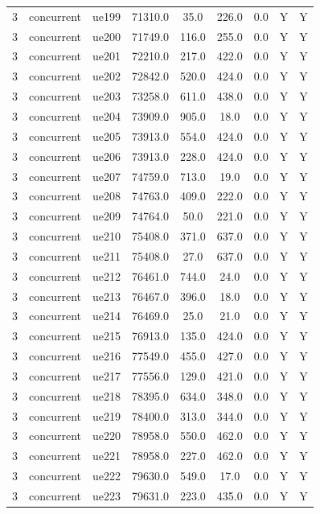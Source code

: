 \begin{table}[ht]
\begin{tabular}{|c|c|c|c|c|c|c|c|c|}
3 & concurrent & ue199 & 71310.0 & 35.0 & 226.0 & 0.0 & Y & Y \\
3 & concurrent & ue200 & 71749.0 & 116.0 & 255.0 & 0.0 & Y & Y \\
3 & concurrent & ue201 & 72210.0 & 217.0 & 422.0 & 0.0 & Y & Y \\
3 & concurrent & ue202 & 72842.0 & 520.0 & 424.0 & 0.0 & Y & Y \\
3 & concurrent & ue203 & 73258.0 & 611.0 & 438.0 & 0.0 & Y & Y \\
3 & concurrent & ue204 & 73909.0 & 905.0 & 18.0 & 0.0 & Y & Y \\
3 & concurrent & ue205 & 73913.0 & 554.0 & 424.0 & 0.0 & Y & Y \\
3 & concurrent & ue206 & 73913.0 & 228.0 & 424.0 & 0.0 & Y & Y \\
3 & concurrent & ue207 & 74759.0 & 713.0 & 19.0 & 0.0 & Y & Y \\
3 & concurrent & ue208 & 74763.0 & 409.0 & 222.0 & 0.0 & Y & Y \\
3 & concurrent & ue209 & 74764.0 & 50.0 & 221.0 & 0.0 & Y & Y \\
3 & concurrent & ue210 & 75408.0 & 371.0 & 637.0 & 0.0 & Y & Y \\
3 & concurrent & ue211 & 75408.0 & 27.0 & 637.0 & 0.0 & Y & Y \\
3 & concurrent & ue212 & 76461.0 & 744.0 & 24.0 & 0.0 & Y & Y \\
3 & concurrent & ue213 & 76467.0 & 396.0 & 18.0 & 0.0 & Y & Y \\
3 & concurrent & ue214 & 76469.0 & 25.0 & 21.0 & 0.0 & Y & Y \\
3 & concurrent & ue215 & 76913.0 & 135.0 & 424.0 & 0.0 & Y & Y \\
3 & concurrent & ue216 & 77549.0 & 455.0 & 427.0 & 0.0 & Y & Y \\
3 & concurrent & ue217 & 77556.0 & 129.0 & 421.0 & 0.0 & Y & Y \\
3 & concurrent & ue218 & 78395.0 & 634.0 & 348.0 & 0.0 & Y & Y \\
3 & concurrent & ue219 & 78400.0 & 313.0 & 344.0 & 0.0 & Y & Y \\
3 & concurrent & ue220 & 78958.0 & 550.0 & 462.0 & 0.0 & Y & Y \\
3 & concurrent & ue221 & 78958.0 & 227.0 & 462.0 & 0.0 & Y & Y \\
3 & concurrent & ue222 & 79630.0 & 549.0 & 17.0 & 0.0 & Y & Y \\
3 & concurrent & ue223 & 79631.0 & 223.0 & 435.0 & 0.0 & Y & Y \\

\end{tabular}
\end{table}
